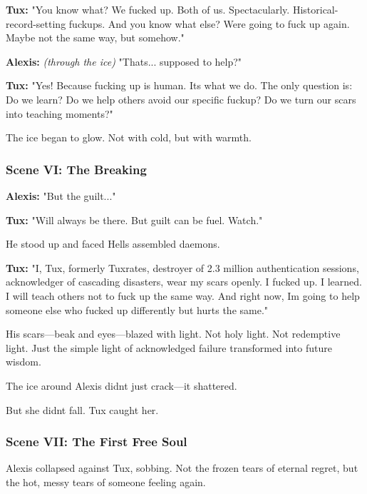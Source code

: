 \textbf{Tux:} "You know what? We fucked up. Both of us. Spectacularly. Historical-record-setting fuckups. And you know what else? We\textquotesingle re going to fuck up again. Maybe not the same way, but somehow."

\textbf{Alexis:} \emph{(through the ice)} "That\textquotesingle s... supposed to help?"

\textbf{Tux:} "Yes! Because fucking up is human. It\textquotesingle s what we do. The only question is: Do we learn? Do we help others avoid our specific fuckup? Do we turn our scars into teaching moments?"

The ice began to glow. Not with cold, but with warmth.

\bookdivider

\subsubsection{Scene VI: The Breaking}\label{scene-vi-the-breaking}

\textbf{Alexis:} "But the guilt..."

\textbf{Tux:} "Will always be there. But guilt can be fuel. Watch."

He stood up and faced Hell\textquotesingle s assembled daemons.

\textbf{Tux:} "I, Tux, formerly Tuxrates, destroyer of 2.3 million authentication sessions, acknowledger of cascading disasters, wear my scars openly. I fucked up. I learned. I will teach others not to fuck up the same way. And right now, I\textquotesingle m going to help someone else who fucked up differently but hurts the same."

His scars---beak and eyes---blazed with light. Not holy light. Not redemptive light. Just the simple light of acknowledged failure transformed into future wisdom.

The ice around Alexis didn\textquotesingle t just crack---it shattered.

But she didn\textquotesingle t fall. Tux caught her.

\bookdivider

\subsubsection{Scene VII: The First Free Soul}\label{scene-vii-the-first-free-soul}

Alexis collapsed against Tux, sobbing. Not the frozen tears of eternal regret, but the hot, messy tears of someone feeling again.

